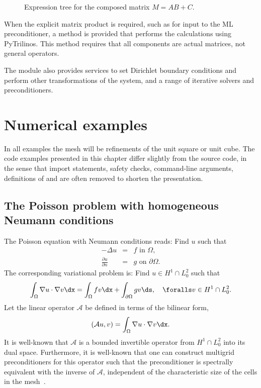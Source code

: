 %
\begin{figure}
  \center{}
  \caption{Expression tree for the composed matrix $M = A B + C$.}
  \label{fig:mardal-4:block:dag}
\end{figure}



When the explicit matrix product is required, such as for input to the ML preconditioner, a method  is provided that performs the calculations using PyTrilinos. This method requires that all components are actual matrices, not general operators.

The module
also provides services to set Dirichlet boundary conditions and perform other transformations of the system, and a range of iterative solvers and preconditioners.




\section{Numerical examples}

In all examples the mesh will be refinements of the unit square or
unit cube.  The code examples presented in this chapter differ
slightly from the source code, in the sense that import statements,
safety checks, command-line arguments, definitions of 
and  are often removed to shorten the presentation.

\subsection{The Poisson problem with homogeneous Neumann conditions}
The Poisson equation with Neumann conditions reads:
Find $u$ such that
\begin{eqnarray}
-\Delta u &= &f \mbox{ in } \Omega,  \\
    \frac{\partial u}{\partial n} &=&  g \mbox{ on } \partial \Omega .
\end{eqnarray}
The corresponding variational problem is:  Find $u\in H^1 \cap L^2_0$ such that
\[
\int_\Omega \nabla u \cdot \nabla v \dx = \int_\Omega f v \dx +
\int_{\partial \Omega} g v  \ds, \quad\foralls v \in H^1 \cap L^2_0 .
\]
Let the linear operator $\mathcal{A}$ be defined in terms of the  bilinear form,
\[
(\mathcal{A} u, v) =  \int_\Omega \nabla u \cdot \nabla v \dx.
\]
It is well-known that $\mathcal{A}$ is a bounded invertible operator
from $H^1 \cap L^2_0$ into its dual space.  Furthermore, it is
well-known that one can construct multigrid preconditioners for this
operator such that the preconditioner is spectrally equivalent with
the inverse of $\mathcal{A}$, independent of the characteristic size
of the cells in the
mesh~\citep{Bramble1993,Hackbusch1994,TrottenbergOosterleeSchuller2001}.

